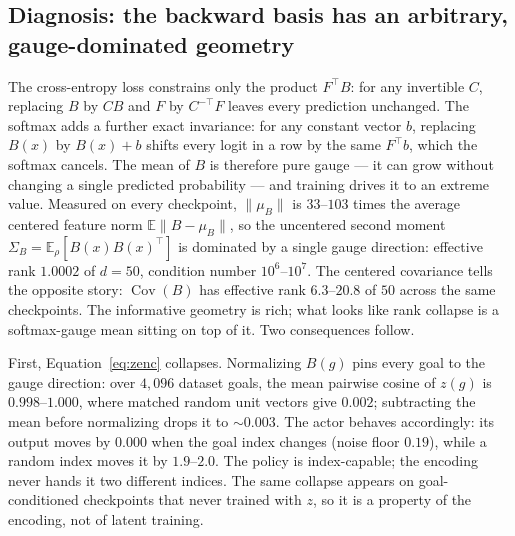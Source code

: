 \documentclass{article}
\newcommand{\E}{\mathbb{E}}
\begin{document}
\subsection{Diagnosis: the backward basis has an arbitrary, gauge-dominated geometry}

The cross-entropy loss constrains only the product $F^\top B$: for any invertible $C$, replacing $B$ by $CB$ and $F$ by $C^{-\top}F$ leaves every prediction unchanged.
The softmax adds a further exact invariance: for any constant vector $b$, replacing $B(x)$ by $B(x)+b$ shifts every logit in a row by the same $F^\top b$, which the softmax cancels.
The mean of $B$ is therefore pure gauge --- it can grow without changing a single predicted probability --- and training drives it to an extreme value.
Measured on every checkpoint, $\|\mu_B\|$ is $33$--$103$ times the average centered feature norm $\E\|B-\mu_B\|$, so the uncentered second moment $\Sigma_B=\E_\rho[B(x)B(x)^\top]$ is dominated by a single gauge direction: effective rank $1.0002$ of $d=50$, condition number $10^6$--$10^7$.
The centered covariance tells the opposite story: $\operatorname{Cov}(B)$ has effective rank $6.3$--$20.8$ of $50$ across the same checkpoints.
The informative geometry is rich; what looks like rank collapse is a softmax-gauge mean sitting on top of it.
Two consequences follow.

First, Equation~\ref{eq:zenc} collapses.
Normalizing $B(g)$ pins every goal to the gauge direction: over $4{,}096$ dataset goals, the mean pairwise cosine of $z(g)$ is $0.998$--$1.000$, where matched random unit vectors give $0.002$; subtracting the mean before normalizing drops it to ${\sim}0.003$.
The actor behaves accordingly: its output moves by $0.000$ when the goal index changes (noise floor $0.19$), while a random index moves it by $1.9$--$2.0$.
The policy is index-capable; the encoding never hands it two different indices.
The same collapse appears on goal-conditioned checkpoints that never trained with $z$, so it is a property of the encoding, not of latent training.
\end{document}
